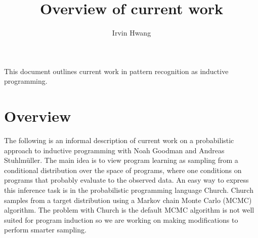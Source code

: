 \documentclass[a4paper,10pt]{article}
\begin{document}
\title{Overview of current work}
\author{Irvin Hwang}
\date{}
\maketitle
This document outlines current work in pattern recognition as inductive programming.

\section{Overview}
The following is an informal description of current work on a probabilistic approach to inductive programming with Noah Goodman and Andreas Stuhlm\"{u}ller.  The main idea is to view program learning as sampling from a conditional distribution over the space of programs, where one conditions on programs that probably evaluate to the observed data.  An easy way to express this inference task is in the probabilistic programming language Church.  Church samples from a target distribution using a Markov chain Monte Carlo (MCMC) algorithm.  The problem with Church is the default MCMC algorithm is not well suited for program induction so we are working on making modifications to perform smarter sampling.
\end{document}
